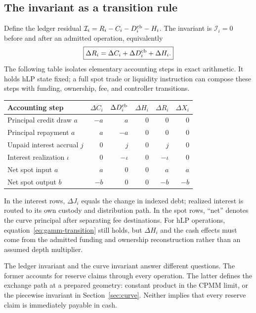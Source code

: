 \subsection{The invariant as a transition rule}

Define the ledger residual $\mathcal I_i=R_i-C_i-D_i^{\rm cb}-H_i$. The invariant is $\mathcal I_i=0$ before and after an admitted operation, equivalently
\begin{equation}
\boxed{\Delta R_i=\Delta C_i+\Delta D_i^{\rm cb}+\Delta H_i.}
\label{eq:gamm-transition}
\end{equation}
The following table isolates elementary accounting steps in exact arithmetic. It holds hLP state fixed; a full spot trade or liquidity instruction can compose these steps with funding, ownership, fee, and controller transitions.

\begin{center}\small
\begin{tabular}{@{}lrrrrr@{}}
\toprule
Accounting step & $\Delta C_i$ & $\Delta D_i^{\rm cb}$ & $\Delta H_i$ & $\Delta R_i$ & $\Delta X_i$ \\
\midrule
Principal credit draw $a$ & $-a$ & $a$ & $0$ & $0$ & $0$ \\
Principal repayment $a$ & $a$ & $-a$ & $0$ & $0$ & $0$ \\
Unpaid interest accrual $j$ & $0$ & $j$ & $0$ & $j$ & $0$ \\
Interest realization $\iota$ & $0$ & $-\iota$ & $0$ & $-\iota$ & $0$ \\
Net spot input $a$ & $a$ & $0$ & $0$ & $a$ & $a$ \\
Net spot output $b$ & $-b$ & $0$ & $0$ & $-b$ & $-b$ \\
\bottomrule
\end{tabular}\end{center}

In the interest rows, $\Delta J_i$ equals the change in indexed debt; realized interest is routed to its own custody and distribution path. In the spot rows, ``net'' denotes the curve principal after separating fee destinations. For hLP operations, equation~\eqref{eq:gamm-transition} still holds, but $\Delta H_i$ and the cash effects must come from the admitted funding and ownership reconstruction rather than an assumed depth multiplier.

The ledger invariant and the curve invariant answer different questions. The former accounts for reserve claims through every operation. The latter defines the exchange path at a prepared geometry: constant product in the CPMM limit, or the piecewise invariant in Section~\ref{sec:curve}. Neither implies that every reserve claim is immediately payable in cash.

